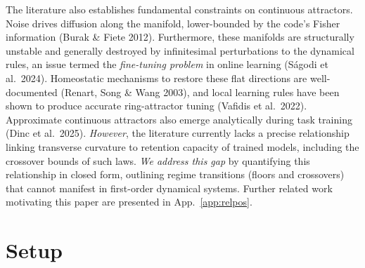 \documentclass{article}
\begin{document}
The literature also establishes fundamental constraints on continuous attractors. Noise drives diffusion along the manifold, lower-bounded by the code's Fisher information (Burak \& Fiete 2012). Furthermore, these manifolds are structurally unstable and generally destroyed by infinitesimal perturbations to the dynamical rules, an issue termed the \emph{fine-tuning problem} in online learning (S\'agodi et al.\ 2024). Homeostatic mechanisms to restore these flat directions are well-documented (Renart, Song \& Wang 2003), and local learning rules have been shown to produce accurate ring-attractor tuning (Vafidis et al.\ 2022). Approximate continuous attractors also emerge analytically during task training (Dinc et al.\ 2025). \emph{However}, the literature currently lacks a precise relationship linking transverse curvature to retention capacity of trained models, including the crossover bounds of such laws. \emph{We address this gap} by quantifying this relationship in closed form, outlining regime transitions (floors and crossovers) that cannot manifest in first-order dynamical systems. Further related work motivating this paper are presented in App.~\ref{app:relpos}.

\section{Setup}\label{sec:setup}
\end{document}
